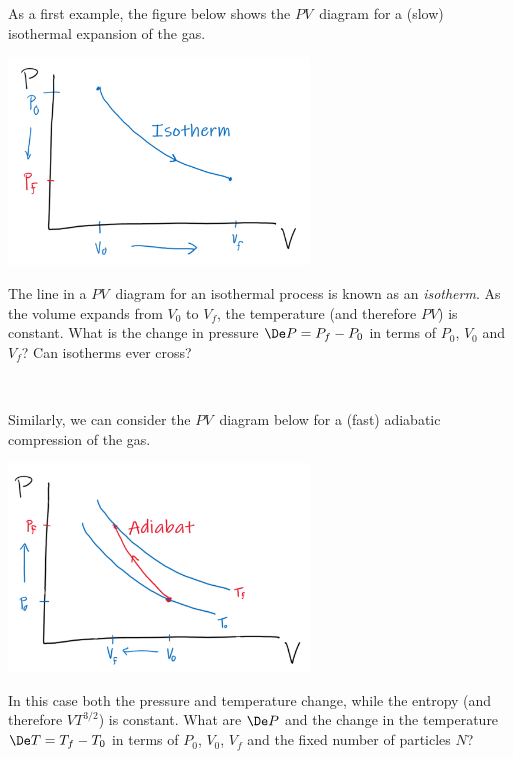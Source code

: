 As a first example, the figure below shows the $PV$~diagram for a (slow) isothermal expansion of the gas.
\begin{center}
  \includegraphics[width=0.6\textwidth]{figs/unit05_isotherm.pdf}
\end{center}
\newpage %
\noindent The line in a $PV$~diagram for an isothermal process is known as an \textit{isotherm}.
As the volume expands from $V_0$ to $V_f$, the temperature (and therefore $PV$) is constant.
What is the change in pressure $\De P = P_f - P_0$ in terms of $P_0$, $V_0$ and $V_f$?
Can isotherms ever cross?
\begin{mdframed}
  \ \\[100 pt]
\end{mdframed}

Similarly, we can consider the $PV$~diagram below for a (fast) adiabatic compression of the gas.
\begin{center}
  \includegraphics[width=0.6\textwidth]{figs/unit05_adiabat.pdf}
\end{center}
In this case both the pressure and temperature change, while the entropy (and therefore $VT^{3 / 2}$) is constant.
What are $\De P$ and the change in the temperature $\De T = T_f - T_0$ in terms of $P_0$, $V_0$, $V_f$ and the fixed number of particles $N$?
\begin{mdframed}
  \ \\[120 pt]
\end{mdframed}



